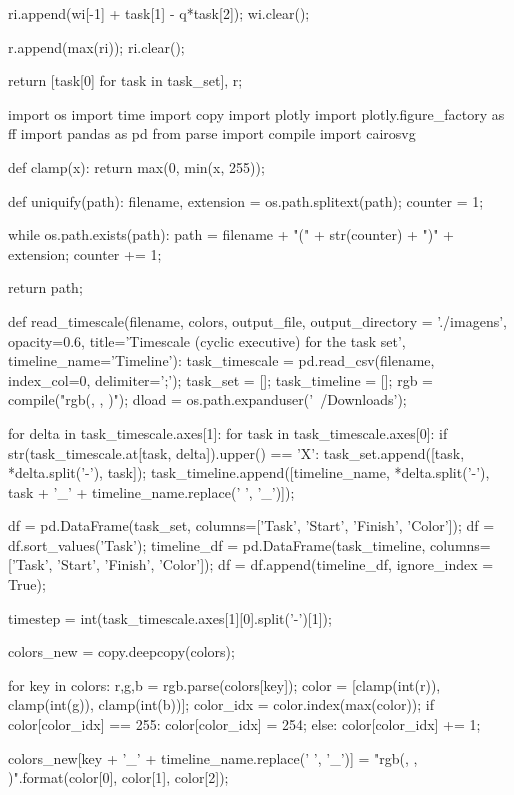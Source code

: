 \documentclass[
	10pt,				%
	openright,			%
	oneside,			%
	a4paper,			%
	english,			%
	french,				%
	spanish,			%
	brazil,				%
	]{abntex2}
\newcommand{\ª}{%
\textordfeminine
}
\begin{document}
\begin{sagesilent}
                ri.append(wi[-1] + task[1] - q*task[2]);
                wi.clear();

            r.append(max(ri));
            ri.clear();
            
    return [task[0] for task in task_set], r;

import os
import time
import copy
import plotly
import plotly.figure_factory as ff
import pandas as pd
from parse import compile
import cairosvg

def clamp(x): 
    return max(0, min(x, 255));

def uniquify(path):
    filename, extension = os.path.splitext(path);
    counter = 1;

    while os.path.exists(path):
        path = filename + "(" + str(counter) + ")" + extension;
        counter += 1;

    return path;

def read_timescale(filename, colors, output_file, output_directory = './imagens', opacity=0.6, title='Timescale (cyclic executive) for the task set', timeline_name='Timeline'):
    task_timescale = pd.read_csv(filename, index_col=0, delimiter=';');
    task_set = [];
    task_timeline = [];
    rgb = compile("rgb({}, {}, {})");
    dload = os.path.expanduser('~/Downloads');
    
    for delta in task_timescale.axes[1]:
        for task in task_timescale.axes[0]:
            if str(task_timescale.at[task, delta]).upper() == 'X':
                task_set.append([task, *delta.split('-'), task]);
                task_timeline.append([timeline_name, *delta.split('-'), task + '_' + timeline_name.replace(' ', '_')]);

    df = pd.DataFrame(task_set, columns=['Task', 'Start', 'Finish', 'Color']);
    df = df.sort_values('Task');
    timeline_df = pd.DataFrame(task_timeline, columns=['Task', 'Start', 'Finish', 'Color']);
    df = df.append(timeline_df, ignore_index = True);

    timestep = int(task_timescale.axes[1][0].split('-')[1]);

    colors_new = copy.deepcopy(colors);

    for key in colors:
        r,g,b = rgb.parse(colors[key]);
        color = [clamp(int(r)), clamp(int(g)), clamp(int(b))];
        color_idx = color.index(max(color));
        if color[color_idx] == 255:
            color[color_idx] = 254;
        else:
            color[color_idx] += 1;
            
        colors_new[key + '_' + timeline_name.replace(' ', '_')] = "rgb({}, {}, {})".format(color[0], color[1], color[2]);
    

\end{sagesilent}
\end{document}
